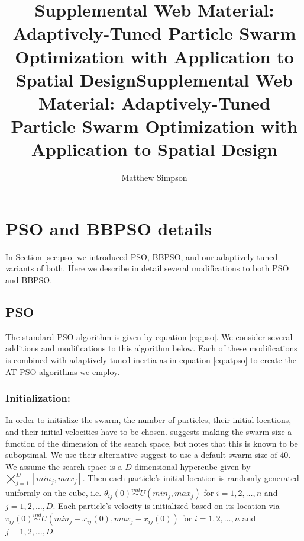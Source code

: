 \documentclass[cmbright]{staauth}
\begin{document}
\blind
{
  \title{Supplemental Web Material: Adaptively-Tuned Particle Swarm Optimization with Application to Spatial Design}
  \author{Matthew Simpson}
  \address{Department of Statistics, University of Missouri,\\
    146 Middlebush Hall, Columbia, MO 65211-6100}
  \received{}
  \accepted{}

}\fi
{}\blind
{
  \title{Supplemental Web Material: Adaptively-Tuned Particle Swarm Optimization with Application to Spatial Design}
  \author{}
  \address{}
  \corremail{}
  \received{}
  \accepted{}

}\fi

\maketitle

\appendix
\section{PSO and BBPSO details}\label{app:psodetail}

In Section \ref{sec:pso} we introduced PSO, BBPSO, and our adaptively tuned variants of both. Here we describe in detail several modifications to both PSO and BBPSO.

\subsection{PSO}\label{subapp:pso}
The standard PSO algorithm is given by equation \eqref{eq:pso}. We consider several additions and modifications to this algorithm below. Each of these modifications is combined with adaptively tuned inertia as in equation \eqref{eq:atpso} to create the AT-PSO algorithms we employ.

\subsubsection{Initialization:}
In order to initialize the swarm, the number of particles, their initial locations, and their initial velocities have to be chosen. \citet{clerc2011spso} suggests making the swarm size a function of the dimension of the search space, but notes that this is known to be suboptimal. We use their alternative suggest to use a default swarm size of 40. We assume the search space is a $D$-dimensional hypercube given by $\bigtimes_{j=1}^D[min_j, max_j]$. Then each particle's initial location is randomly generated uniformly on the cube, i.e. $\theta_{ij}(0)\stackrel{ind}{\sim}U(min_j, max_j)$ for $i=1,2,\dots,n$ and $j=1,2,\dots,D$. Each particle's velocity is initialized based on its location via  $v_{ij}(0)\stackrel{ind}{\sim}U(min_j - x_{ij}(0), max_j - x_{ij}(0))$ for $i=1,2,\dots,n$ and $j=1,2,\dots,D$.
\end{document}
